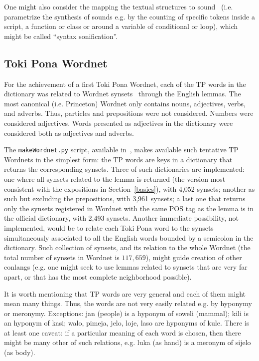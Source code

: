 \documentclass{article}
\newcommand{\tttt}[1]{\texttt{#1}}
\begin{document}
One might also 
consider the mapping the textual structures
to sound~\cite{mass} (i.e. parametrize the synthesis of sounds e.g. 
by the counting of specific tokens inside a script, a function or
class or around a variable of conditional or
loop), which might be called ``syntax sonification''.

\subsection{Toki Pona Wordnet}\label{wn}
For the achievement of a first Toki Pona Wordnet,
each of the TP words in the dictionary
was related to Wordnet synsets~\cite{wordnet}
through the English lemmas.
The most canonical (i.e. Princeton) Wordnet only contains nouns,
adjectives, verbs, and adverbs.
Thus, particles and prepositions were not considered.
Numbers were considered adjectives.
Words presented as adjectives in the dictionary
were considered both as adjectives and adverbs.~\cite{wordnet}

The \tttt{makeWordnet.py} script, available in~\cite{tokipona},
makes available such tentative TP Wordnets in the simplest form:
the TP words are keys in a dictionary that returns the
corresponding synsets.
Three of such dictionaries are implemented:
one where all synsets related to the lemma is
returned (the version most consistent
with the expositions in Section~\ref{basics}),
with 4,052 synsets;
another as such but excluding the prepositions,
with 3,961 synsets;
a last one that returns only the synsets
registered in Wordnet with the same POS tag as the lemma
is in the official dictionary,
with 2,493 synsets. 
Another immediate possibility, not implemented,
would be to relate each Toki Pona word to the synsets
simultaneously associated to all the English
words bounded by a semicolon in the dictionary.
Such collection of synsets, and its relation to the whole
Wordnet
(the total number of synsets in Wordnet is $117,659$),
might guide creation of other conlangs
(e.g. one might seek to use lemmas related to synsets that
are very far apart, or that has the most complete neighborhood
possible).

It is worth mentioning that TP words are very general
and each of them might mean many things.
Thus, the words are not very easily related e.g. by hyponymy
or meronymy.
Exceptions: jan (people) is a hyponym of soweli (mammal);
kili is an hyponym of kasi;
walo, pimeja, jelo, loje, laso
are hyponyms of kule.
There is at least one caveat:
if a particular meaning of each word is chosen,
then there might be many other of such relations,
e.g. 
luka (as hand) is a meronym of sijelo (as body).
\end{document}
